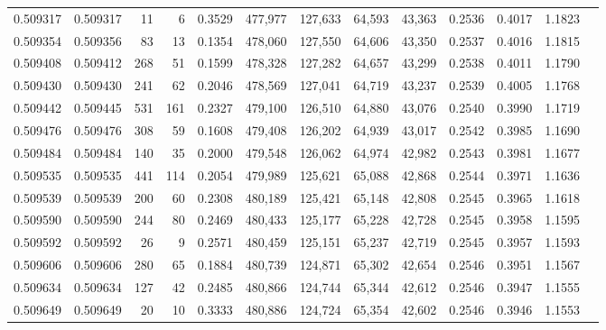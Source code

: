 \begin{tabular}{rrrrrrrrrrrrr}
0.509317 & 0.509317 &    11 &     6 &                                     0.3529 & 477,977 & 127,633 &  64,593 &  43,363 & 0.2536 & 0.4017 & 1.1823 \\
0.509354 & 0.509356 &    83 &    13 &                                     0.1354 & 478,060 & 127,550 &  64,606 &  43,350 & 0.2537 & 0.4016 & 1.1815 \\
0.509408 & 0.509412 &   268 &    51 &                                     0.1599 & 478,328 & 127,282 &  64,657 &  43,299 & 0.2538 & 0.4011 & 1.1790 \\
0.509430 & 0.509430 &   241 &    62 &                                     0.2046 & 478,569 & 127,041 &  64,719 &  43,237 & 0.2539 & 0.4005 & 1.1768 \\
0.509442 & 0.509445 &   531 &   161 &                                     0.2327 & 479,100 & 126,510 &  64,880 &  43,076 & 0.2540 & 0.3990 & 1.1719 \\
0.509476 & 0.509476 &   308 &    59 &                                     0.1608 & 479,408 & 126,202 &  64,939 &  43,017 & 0.2542 & 0.3985 & 1.1690 \\
0.509484 & 0.509484 &   140 &    35 &                                     0.2000 & 479,548 & 126,062 &  64,974 &  42,982 & 0.2543 & 0.3981 & 1.1677 \\
0.509535 & 0.509535 &   441 &   114 &                                     0.2054 & 479,989 & 125,621 &  65,088 &  42,868 & 0.2544 & 0.3971 & 1.1636 \\
0.509539 & 0.509539 &   200 &    60 &                                     0.2308 & 480,189 & 125,421 &  65,148 &  42,808 & 0.2545 & 0.3965 & 1.1618 \\
0.509590 & 0.509590 &   244 &    80 &                                     0.2469 & 480,433 & 125,177 &  65,228 &  42,728 & 0.2545 & 0.3958 & 1.1595 \\
0.509592 & 0.509592 &    26 &     9 &                                     0.2571 & 480,459 & 125,151 &  65,237 &  42,719 & 0.2545 & 0.3957 & 1.1593 \\
0.509606 & 0.509606 &   280 &    65 &                                     0.1884 & 480,739 & 124,871 &  65,302 &  42,654 & 0.2546 & 0.3951 & 1.1567 \\
0.509634 & 0.509634 &   127 &    42 &                                     0.2485 & 480,866 & 124,744 &  65,344 &  42,612 & 0.2546 & 0.3947 & 1.1555 \\
0.509649 & 0.509649 &    20 &    10 &                                     0.3333 & 480,886 & 124,724 &  65,354 &  42,602 & 0.2546 & 0.3946 & 1.1553 \\

\end{tabular}
